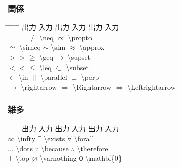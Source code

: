 \documentclass[11pt,a4j,onecolumn]{jsreport} %
\begin{document}
\subsubsection{関係}

\begin{tabbing}
  \hspace{20truemm} \= \hspace{10truemm} \= \hspace{30truemm} \= \hspace{10truemm} \= \hspace{30truemm} \= \hspace{10truemm} \= \hspace{20truemm} \kill
  \> 出力 \> 入力 \> 出力 \> 入力 \> 出力 \> 入力 \\
  \> $=$ \> = \> $\neq$ \> \textbackslash neq \> $\propto$ \> \textbackslash propto \\
  \> $\simeq$ \> \textbackslash simeq \> $\sim$ \> \textbackslash sim \> $\approx$ \> \textbackslash approx \\
  \> $>$ \> \textgreater \> $\geq$ \> \textbackslash geq \> $\supset$ \> \textbackslash supset \\
  \> $<$ \> \textless \> $\leq$ \> \textbackslash leq \> $\subset$ \> \textbackslash subset \\
  \> $\in$ \> \textbackslash in \> $\parallel$ \> \textbackslash parallel \> $\perp$ \> \textbackslash perp \\
  \> $\rightarrow$ \> \textbackslash rightarrow \> $\Rightarrow$ \> \textbackslash Rightarrow \> $\Leftrightarrow$ \> \textbackslash Leftrightarrow \\
\end{tabbing}

\subsubsection{雑多}

\begin{tabbing}
  \hspace{20truemm} \= \hspace{10truemm} \= \hspace{30truemm} \= \hspace{10truemm} \= \hspace{30truemm} \= \hspace{10truemm} \= \hspace{20truemm} \kill
  \> 出力 \> 入力 \> 出力 \> 入力 \> 出力 \> 入力 \\
  \> $\infty$ \> \textbackslash infty \> $\exists$ \> \textbackslash exists \> $\forall$ \> \textbackslash forall \\
  \> $\dots$ \> \textbackslash dots \> $\because$ \> \textbackslash because \> $\therefore$ \> \textbackslash therefore \\
  \> $\top$ \> \textbackslash top \> $\varnothing$ \> \textbackslash varnothing \> $\mathbf{0}$ \> \textbackslash mathbf\{0\} \\
\end{tabbing}
\end{document}
